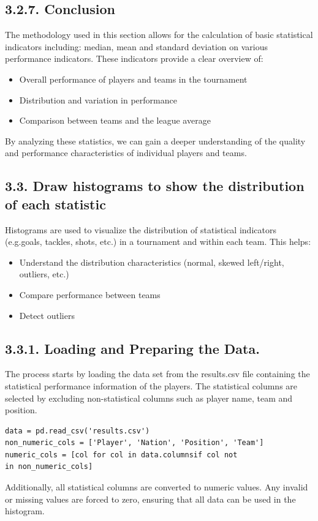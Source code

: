 \documentclass[a4paper,12pt]{article}
\begin{document}
\subsection*{\textbf{3.2.7. Conclusion}}
The methodology used in this section allows for the calculation of basic statistical indicators including: median, mean and standard deviation on various performance indicators. These indicators provide a clear overview of:
\begin{itemize}
    \item Overall performance of players and teams in the tournament
    \item Distribution and variation in performance
    \item Comparison between teams and the league average  
\end{itemize}  
By analyzing these statistics, we can gain a deeper understanding of the quality and performance characteristics of individual players and teams.

\subsection*{\textbf{\Large 3.3. Draw histograms to show the distribution of each statistic}}
Histograms are used to visualize the distribution of statistical indicators (e.g.goals, tackles, shots, etc.) in a tournament and within each team. This helps:
\begin{itemize}
    \item Understand the distribution characteristics (normal, skewed left/right, outliers, etc.)
    \item Compare performance between teams
    \item Detect outliers
\end{itemize}
\subsection*{\textbf{3.3.1. Loading and Preparing the Data.
}}
The process starts by loading the data set from the results.csv file containing the statistical performance information of the players. The statistical columns are selected by excluding non-statistical columns such as player name, team and position.
\begin{mdframed}
\begin{verbatim}
data = pd.read_csv('results.csv')
non_numeric_cols = ['Player', 'Nation', 'Position', 'Team']
numeric_cols = [col for col in data.columnsif col not 
in non_numeric_cols]
\end{verbatim}
\end{mdframed}
Additionally, all statistical columns are converted to numeric values. Any invalid or missing values are forced to zero, ensuring that all data can be used in the histogram.
\end{document}

